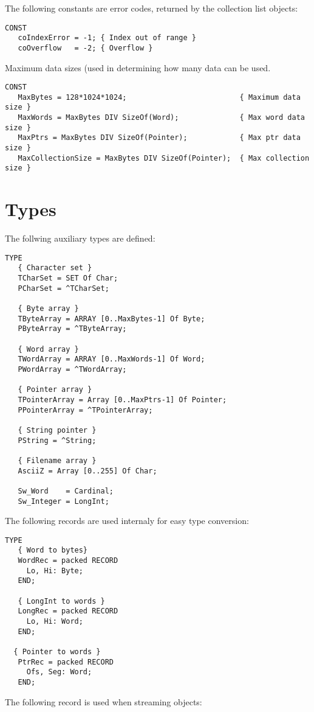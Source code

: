 The following constants are error codes, returned by the collection list
objects:
\begin{verbatim}
CONST
   coIndexError = -1; { Index out of range }
   coOverflow   = -2; { Overflow }
\end{verbatim}

Maximum data sizes (used in determining how many data can be used.

\begin{verbatim}
CONST
   MaxBytes = 128*1024*1024;                          { Maximum data size }
   MaxWords = MaxBytes DIV SizeOf(Word);              { Max word data size }
   MaxPtrs = MaxBytes DIV SizeOf(Pointer);            { Max ptr data size }
   MaxCollectionSize = MaxBytes DIV SizeOf(Pointer);  { Max collection size }
\end{verbatim}

\section{Types}
The follwing auxiliary types are defined:
\begin{verbatim}
TYPE
   { Character set }
   TCharSet = SET Of Char;                            
   PCharSet = ^TCharSet;

   { Byte array }
   TByteArray = ARRAY [0..MaxBytes-1] Of Byte;        
   PByteArray = ^TByteArray;

   { Word array }
   TWordArray = ARRAY [0..MaxWords-1] Of Word;        
   PWordArray = ^TWordArray;

   { Pointer array }
   TPointerArray = Array [0..MaxPtrs-1] Of Pointer;   
   PPointerArray = ^TPointerArray; 

   { String pointer }
   PString = ^String;

   { Filename array }
   AsciiZ = Array [0..255] Of Char;

   Sw_Word    = Cardinal;
   Sw_Integer = LongInt;
\end{verbatim}
The following records are used internaly for easy type conversion:
\begin{verbatim}
TYPE
   { Word to bytes}
   WordRec = packed RECORD
     Lo, Hi: Byte;     
   END;

   { LongInt to words }
   LongRec = packed RECORD
     Lo, Hi: Word;
   END;

  { Pointer to words }
   PtrRec = packed RECORD
     Ofs, Seg: Word;
   END;
\end{verbatim}
The following record is used when streaming objects:

